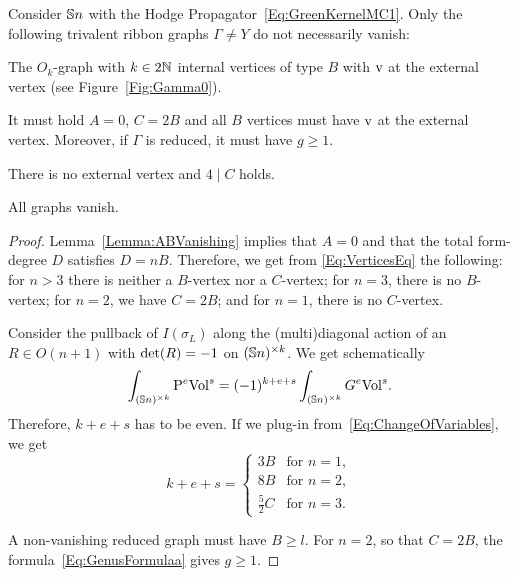 \documentclass[\MainFolder/Text.tex]{subfiles}
\begin{document}
\begin{Proposition} \label{Prop:TotalVanishing}
Consider $\mathbb{S}{n}$ with the Hodge Propagator~\eqref{Eq:GreenKernelMC1}.
Only the following trivalent ribbon graphs $\Gamma \neq Y$ do not necessarily vanish:
\begin{description}[font=\normalfont\itshape]
 \item[($n=1$):] The $O_{k}$-graph with $k\in 2\mathbb{N}$ internal vertices of type $B$ with $\mathrm{v}$ at the external vertex (see Figure~\ref{Fig:Gamma0}).
 \item[($n=2$):] It must hold $A=0$, $C=2B$ and all $B$ vertices must have $\mathrm{v}$ at the external vertex.
 Moreover, if $\Gamma$ is reduced, it must have $g\ge 1$.
 \item[($n=3$):] There is no external vertex and $4 \mid C$ holds.
 \item[($n>3$):] All graphs vanish.
\end{description}
\end{Proposition}
\begin{proof}
Lemma~\ref{Lemma:ABVanishing} implies that $A=0$ and that the total form-degree $D$ satisfies $D= n B$.
Therefore, we get from \eqref{Eq:VerticesEq} the following: for $n>3$ there is neither a $B$-vertex nor a $C$-vertex; for $n=3$, there is no $B$-vertex; for $n=2$, we have $C=2B$; and for $n=1$, there is no $C$-vertex.

Consider the pullback of $I(\sigma_L)$ along the (multi)diagonal action of an $R\in O(n+1)$ with $\operatorname{det}(R)=-1$ on $(\mathbb{S}{n})^{\times k}$.
We get schematically
\[ \int_{(\mathbb{S}{n})^{\times k}} \mathrm{P}^{e}\mathrm{Vol}^{s} = (-1)^{k +e + s} \int_{(\mathbb{S}{n})^{\times k}} G^{e}\mathrm{Vol}^{s}. \]
Therefore, $k+ e + s$ has to be even.
If we plug-in from~\eqref{Eq:ChangeOfVariables}, we get
\[ k+ e + s =  \begin{cases}
3 B & \text{for }n=1, \\
8 B & \text{for }n=2, \\
\frac{5}{2} C & \text{for }n=3.
\end{cases} \]

A non-vanishing reduced graph must have $B\ge l$.
For $n=2$, so that $C=2B$, the formula~\eqref{Eq:GenusFormulaa} gives $g\ge 1$.
\end{proof}
\end{document}
